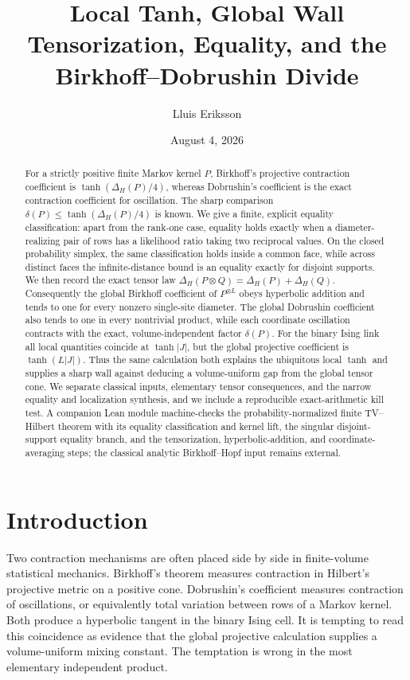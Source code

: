 \documentclass[11pt]{article}
\title{\textbf{Local Tanh, Global Wall}\\[2mm]
Tensorization, Equality, and the Birkhoff--Dobrushin Divide}
\author{Lluis Eriksson}
\date{August 4, 2026}
\newcommand{\diamH}{\Delta_{H}}
\newcommand{\1}{\mathbf{1}}
\begin{document}
\maketitle

\begin{abstract}
For a strictly positive finite Markov kernel $P$, Birkhoff's projective
contraction coefficient is $\tanh(\diamH(P)/4)$, whereas Dobrushin's
coefficient is the exact contraction coefficient for oscillation.  The sharp
comparison $\delta(P)\leq \tanh(\diamH(P)/4)$ is known.  We give a finite,
explicit equality classification: apart from the rank-one case, equality
holds exactly when a diameter-realizing pair of rows has a likelihood ratio
taking two reciprocal values.  On the closed probability simplex, the same
classification holds inside a common face, while across distinct faces the
infinite-distance bound is an equality exactly for disjoint supports.  We
then record the exact tensor law
$\diamH(P\otimes Q)=\diamH(P)+\diamH(Q)$.  Consequently the global Birkhoff
coefficient of $P^{\otimes L}$ obeys hyperbolic addition and tends to one for
every nonzero single-site diameter.  The global Dobrushin coefficient also
tends to one in every nontrivial product, while each coordinate oscillation
contracts with the exact, volume-independent factor $\delta(P)$.  For the
binary Ising link all local quantities coincide at $\tanh |J|$, but the
global projective coefficient is $\tanh(L|J|)$.  Thus the same calculation
both explains the ubiquitous local $\tanh$ and supplies a sharp wall against
deducing a volume-uniform gap from the global tensor cone.  We separate
classical inputs, elementary tensor consequences, and the narrow equality
and localization synthesis, and we include a reproducible exact-arithmetic
kill test.  A companion Lean module machine-checks the probability-normalized
finite TV--Hilbert theorem with its equality classification and kernel lift,
the singular disjoint-support equality branch, and the tensorization,
hyperbolic-addition, and coordinate-averaging steps; the classical analytic
Birkhoff--Hopf input remains external.
\end{abstract}

\section{Introduction}

Two contraction mechanisms are often placed side by side in finite-volume
statistical mechanics.  Birkhoff's theorem measures contraction in Hilbert's
projective metric on a positive cone.  Dobrushin's coefficient measures
contraction of oscillations, or equivalently total variation between rows of
a Markov kernel.  Both produce a hyperbolic tangent in the binary Ising
cell.  It is tempting to read this coincidence as evidence that the global
projective calculation supplies a volume-uniform mixing constant.  The
temptation is wrong in the most elementary independent product.
\end{document}

